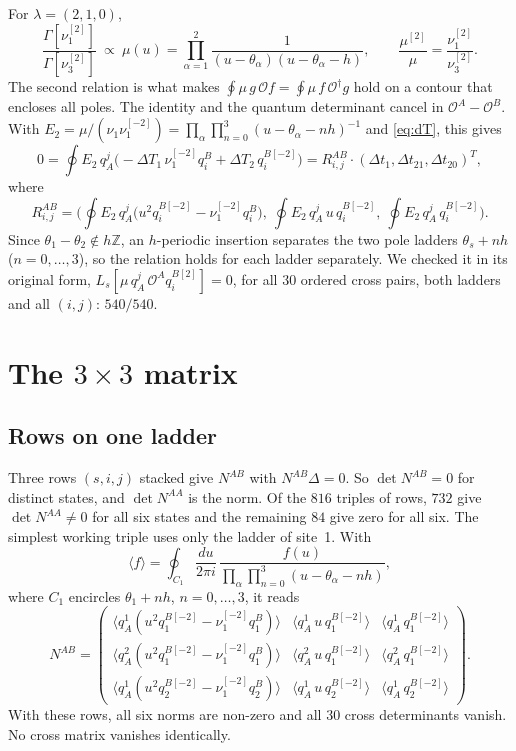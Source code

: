 \documentclass[11pt]{article}
\newcommand{\Op}{\mathcal{O}}
\newcommand{\sh}[1]{^{[#1]}}
\newcommand{\br}[1]{\langle #1\rangle}
\begin{document}
For $\lambda=(2,1,0)$,
\begin{equation}
\frac{\Gamma[\nu_1\sh{2}]}{\Gamma[\nu_3\sh{2}]}\ \propto\ \mu(u)=\prod_{\alpha=1}^2\frac{1}{(u-\theta_\alpha)(u-\theta_\alpha-h)},
\qquad \frac{\mu\sh2}{\mu}=\frac{\nu_1\sh2}{\nu_3\sh2}.
\end{equation}
The second relation is what makes $\oint\mu\,g\,\Op f=\oint\mu\,f\,\Op^\dagger g$ hold on a contour
that encloses all poles. The identity and the quantum determinant cancel in $\Op^A-\Op^B$. With
$E_2=\mu/(\nu_1\nu_1\sh{-2})=\prod_\alpha\prod_{n=0}^{3}(u-\theta_\alpha-nh)^{-1}$ and
\eqref{eq:dT}, this gives
\begin{equation}
0=\oint E_2\,q^j_A\big(-\Delta T_1\,\nu_1\sh{-2}q_i^B+\Delta T_2\,q_i^{B[-2]}\big)
=R^{AB}_{i,j}\cdot(\Delta t_1,\Delta t_{21},\Delta t_{20})^{T},
\end{equation}
where
\begin{equation}
R^{AB}_{i,j}=\Big(\oint E_2\,q^j_A\big(u^2q_i^{B[-2]}-\nu_1\sh{-2}q_i^B\big),\
\oint E_2\,q^j_A\,u\,q_i^{B[-2]},\ \oint E_2\,q^j_A\,q_i^{B[-2]}\Big).
\end{equation}
Since $\theta_1-\theta_2\notin h\mathbb Z$, an $h$-periodic insertion separates the two pole
ladders $\theta_s+nh$ ($n=0,\dots,3$), so the relation holds for each ladder separately. We
checked it in its original form, $L_s[\mu\,q^j_A\,\Op^Aq_i^{B[2]}]=0$, for all $30$ ordered cross
pairs, both ladders and all $(i,j)$: $540/540$.

\section{The $3\times3$ matrix}

\subsection{Rows on one ladder}
Three rows $(s,i,j)$ stacked give $N^{AB}$ with $N^{AB}\Delta=0$. So $\det N^{AB}=0$ for distinct
states, and $\det N^{AA}$ is the norm. Of the $816$ triples of rows, $732$ give $\det N^{AA}\neq0$
for all six states and the remaining $84$ give zero for all six. The simplest working triple uses
only the ladder of site~1. With
\begin{equation}
\br{f}=\oint_{C_1}\frac{du}{2\pi i}\,\frac{f(u)}{\prod_{\alpha}\prod_{n=0}^{3}(u-\theta_\alpha-nh)},
\end{equation}
where $C_1$ encircles $\theta_1+nh$, $n=0,\dots,3$, it reads
\begin{equation}
N^{AB}=\begin{pmatrix}
\br{q^1_A(u^2q_1^{B[-2]}-\nu_1\sh{-2}q_1^B)} & \br{q^1_A\,u\,q_1^{B[-2]}} & \br{q^1_A\,q_1^{B[-2]}}\\
\br{q^2_A(u^2q_1^{B[-2]}-\nu_1\sh{-2}q_1^B)} & \br{q^2_A\,u\,q_1^{B[-2]}} & \br{q^2_A\,q_1^{B[-2]}}\\
\br{q^1_A(u^2q_2^{B[-2]}-\nu_1\sh{-2}q_2^B)} & \br{q^1_A\,u\,q_2^{B[-2]}} & \br{q^1_A\,q_2^{B[-2]}}
\end{pmatrix}.
\end{equation}
With these rows, all six norms are non-zero and all $30$ cross determinants vanish. No cross matrix
vanishes identically.
\end{document}
